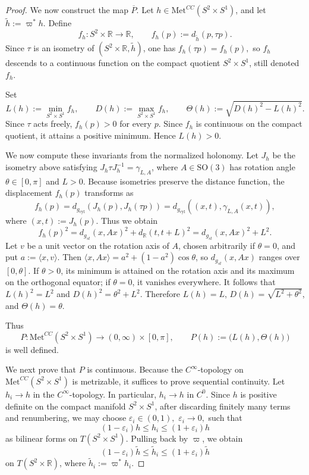 \documentclass[12pt,oneside,a4paper]{article}
\theoremstyle{mytheorem}
\theoremstyle{remark}
\theoremstyle{definition}
\begin{document}
\begin{proof}
We now construct the map \(\overline P\).
Let \(h\in \mathrm{Met}^{CC}(S^2\times S^1)\), and let
$\widetilde h:=\varpi^*h$.
Define
\[
f_h\colon S^2\times \mathbb R\longrightarrow \mathbb R,
\qquad
f_h(p):=d_{\widetilde h}(p,\tau p).
\]
Since \(\tau\) is an isometry of \((S^2\times \mathbb R,\widetilde h)\), one has
$f_h(\tau p)=f_h(p),$
so \(f_h\) descends to a continuous function on the compact quotient \(S^2\times S^1\), still denoted \(f_h\).

Set
\[
L(h):=\min_{S^2\times S^1} f_h,
\qquad
D(h):=\max_{S^2\times S^1} f_h,
\qquad
\Theta(h):=\sqrt{D(h)^2-L(h)^2}.
\]
Since $\tau$ acts freely, $f_h(p)>0$ for every $p$. Since $f_h$ is continuous
on the compact quotient, it attains a positive minimum. Hence $L(h)>0$.

We now compute these invariants from the normalized holonomy. Let $J_h$ be the
isometry above satisfying $J_h\tau J_h^{-1}=\gamma_{L,A}$, where
$A\in\mathrm{SO}(3)$ has rotation angle $\theta\in[0,\pi]$ and $L>0$.
Because isometries preserve the distance function, the displacement $f_h(p)$
transforms as
\[
f_h(p)
=d_{g_{\mathrm{cyl}}}(J_h(p),J_h(\tau p))
=d_{g_{\mathrm{cyl}}}((x,t),\gamma_{L,A}(x,t)),
\]
where $(x,t):=J_h(p)$. Thus we obtain
\[
f_h(p)^2 = d_{g_{st}}(x, Ax)^2 + d_{\mathbb{R}}(t, t+L)^2 = d_{g_{st}}(x, Ax)^2 + L^2.
\]
Let $v$ be a unit vector on the rotation axis of $A$, chosen arbitrarily if
$\theta=0$, and put $a:=\langle x,v\rangle$. Then
\(\langle x,Ax\rangle=a^2+(1-a^2)\cos\theta\),
so $d_{g_{st}}(x,Ax)$ ranges over $[0,\theta]$. If $\theta>0$, its minimum
is attained on the rotation axis and its maximum on the orthogonal equator;
if $\theta=0$, it vanishes everywhere. It follows that
\(L(h)^2 = L^2\) and \(D(h)^2 = \theta^2 + L^2\).
Therefore
\(L(h)=L\), \(D(h)=\sqrt{L^2+\theta^2}\), and \(\Theta(h)=\theta\).

Thus
\[
P\colon\mathrm{Met}^{CC}(S^2\times S^1)\longrightarrow (0,\infty)\times[0,\pi],
\qquad
P(h):=\bigl(L(h),\Theta(h)\bigr)
\]
is well defined.

We next prove that \(P\) is continuous. Because the $C^\infty$-topology on
$\mathrm{Met}^{CC}(S^2\times S^1)$ is metrizable, it suffices to prove
sequential continuity. Let \(h_i\to h\) in the \(C^\infty\)-topology. In
particular, \(h_i\to h\) in \(C^0\). Since \(h\) is positive definite on the compact manifold \(S^2\times S^1\), after discarding finitely many terms and renumbering, we may choose
$\varepsilon_i\in(0,1),$ $\varepsilon_i\to 0,$ such that
\[
(1-\varepsilon_i)h\le h_i\le (1+\varepsilon_i)h
\]
as bilinear forms on \(T(S^2\times S^1)\). Pulling back by \(\varpi\), we obtain
\[
(1-\varepsilon_i)\widetilde h\le \widetilde h_i\le (1+\varepsilon_i)\widetilde h
\]
on \(T(S^2\times \mathbb R)\), where \(\widetilde h_i:=\varpi^*h_i\).


\end{proof}
\end{document}
